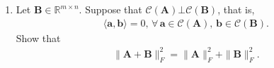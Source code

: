 \documentclass[11pt,letter,notitlepage]{article}
\begin{document}
\begin{exercise}
\begin{enumerate}
\begin{enumerate}
                \item Let $\mathbf{B}\in\mathbb{R}^{m\times n}$. Suppose that $\mathcal{C}(\mathbf{A})\bot\mathcal{C}(\mathbf{B})$, that is, 
                \begin{align*}
                    \langle\mathbf{a},\mathbf{b}\rangle=0,\,\forall\,\mathbf{a}\in\mathcal{C}(\mathbf{A}),\,\mathbf{b}\in\mathcal{C}(\mathbf{B}).
                \end{align*}
                Show that
                \begin{align*}
                    \|\mathbf{A}+\mathbf{B}\|_F^2=\|\mathbf{A}\|_F^2+\|\mathbf{B}\|_F^2.
                \end{align*}
            \end{enumerate}
            
        
    \end{enumerate}
\end{exercise}

\begin{solution}${}$
\end{solution}


\newpage
\end{document}
